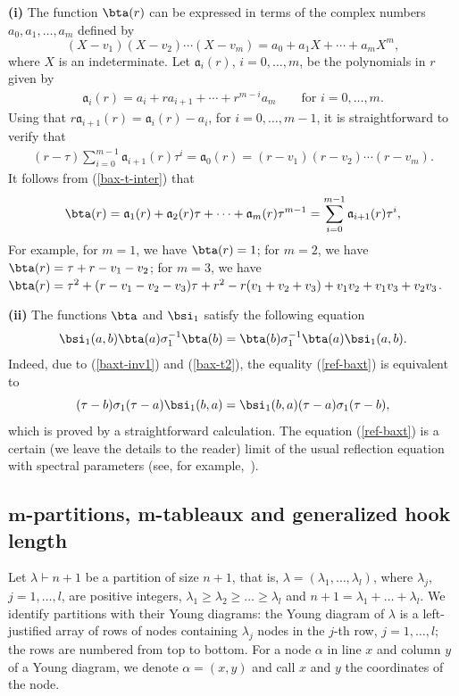 \begin{Remarks} \textbf{(i)}
The function $\bta(r)$ can be expressed in terms of the complex numbers $a_0,a_1,{\dots},a_m$ def\/ined by
\[
(X-v_1)(X-v_2)\cdots(X-v_m)=a_0+a_1X+\cdots+a_{m}X^{m}  ,
\]
where $X$ is an indeterminate.
Let $\mathfrak{a}_i(r)$, $i=0,\dots,m$, be the polynomials in $r$ given by
\begin{gather}\label{polalicl}
\mathfrak{a}_i(r)=a_i+r a_{i+1}+\cdots+r^{m-i}a_m  \qquad\textrm{for \ \ $i=0,\dots,m$.}
\end{gather}
Using that $r \mathfrak{a}_{i+1}(r)=\mathfrak{a}_{i}(r)-a_i$, for $i=0,\dots,m-1$, it is straightforward to verify that
\begin{gather}
\label{bax-t-inter}
(r-\tau)\sum_{i=0}^{m-1}\mathfrak{a}_{i+1}(r)\tau^i=\mathfrak{a}_0(r)=(r-v_1)(r-v_2)\cdots(r-v_m) .
\end{gather}
It follows from (\ref{bax-t-inter}) that
\begin{gather}\label{bax-t}
\bta(r)=\mathfrak{a}_1(r)+\mathfrak{a}_2(r)\tau+\cdots+\mathfrak{a}_{m}(r)\tau^{m-1}=\sum_{i=0}^{m-1}\mathfrak{a}_{i+1}(r)\tau^i  ,
\end{gather}
For example, for $m=1$, we have $\bta(r)=1$; for $m=2$, we have $\bta(r)=\tau+r-v_1-v_2$; for $m=3$, we have $\bta(r)=\tau^2+(r-v_1-v_2-v_3)\tau+r^2-r(v_1+v_2+v_3)+v_1v_2+v_1v_3+v_2v_3 $.


\textbf{(ii)}
The functions $\bta$ and $\bsi_1$ satisfy the following equation
\begin{gather}\label{ref-baxt}
\bsi_1(a,b)\bta(a)\sigma_1^{-1}\bta(b)=\bta(b)\sigma_1^{-1}\bta(a)\bsi_1(a,b)  .
\end{gather}
Indeed, due to (\ref{baxt-inv1}) and (\ref{bax-t2}), the equality (\ref{ref-baxt}) is equivalent to
\[
(\tau-b)\sigma_1(\tau-a)\bsi_1(b,a)=\bsi_1(b,a)(\tau-a)\sigma_1(\tau-b)  ,
\]
which is proved by a straightforward calculation.
The equation (\ref{ref-baxt}) is a certain (we leave the details to the reader) limit of the usual ref\/lection equation with spectral parameters (see, for example,~\cite{K}).
\end{Remarks}

\subsection[$m$-partitions, m-tableaux and generalized hook length]{$\boldsymbol{m}$-partitions, m-tableaux and generalized hook length}


Let $\lambda\vdash n+1$ be a partition of size $n+1$, that is, $\lambda=(\lambda_1,\dots,\lambda_l)$, where $\lambda _j$, $j=1,\dots,l$,
are positive integers, $\lambda_1\geqslant\lambda_2\geqslant\dots\geqslant\lambda_l$ and $n+1=\lambda_1+\dots+\lambda_l$.
We identify partitions with their Young diagrams: the Young diagram of $\lambda$ is a left-justif\/ied array of rows of
nodes containing $\lambda_j$ nodes in the $j$-th row, $j=1,\dots,l$; the rows are numbered from top to bottom.
For a node $\alpha$ in line $x$ and column $y$ of a Young diagram, we denote $\alpha=(x,y)$ and call $x$ and $y$ the coordinates of the node.


